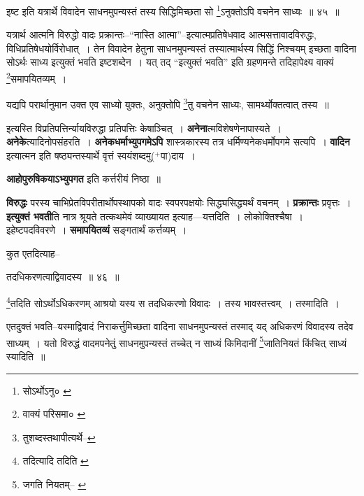 \documentclass[article,12pt,a4paper]{memoir}
\newcommand{\add}[1]{($^{+}$#1)}
\begin{document}
	  \pstart इष्ट इति यत्रार्थे विवादेन साधनमुपन्यस्तं तस्य सिद्धिमिच्छता सो \footnote{सोऽर्थोऽनु० \cite{dp-msC}}\-ऽनुक्तोऽपि वचनेन साध्यः ॥ ४५ ॥
	\pend
      
	  \endgroup
	 

	  \pstart यत्रार्थ आत्मनि विरुद्धो वादः प्रक्रान्तः--“नास्ति आत्मा”--इत्यात्मप्रतिषेधवाद आत्मसत्तावादविरुद्धः, विधिप्रतिषेधयोर्विरोधात् । तेन विवादेन हेतुना साधनमुपन्यस्तं तस्यात्मार्थस्य सिद्धिं निश्चयम् इच्छता वादिना सोऽर्थः साध्य इत्युक्तं भवति इष्टशब्देन । यत् तद् “इत्युक्तं भवति” इति ग्रहणमन्ते तदिहापेक्ष्य वाक्यं \footnote{वाक्यं परिसमा० \cite{dp-msA} \cite{dp-msB} \cite{dp-msC} \cite{dp-msD} \cite{dp-edP} \cite{dp-edH} \cite{dp-edE} \cite{dp-edN}}\-समापयितव्यम् ।
	\pend
       

	  \pstart यद्यपि परार्थानुमान उक्त एव साध्यो युक्तः, अनुक्तोपि \footnote{तुशब्दस्तथापीत्यर्थे--\cite{dp-msD-n}}\-तु वचनेन साध्यः, सामर्थ्योक्तत्वात् तस्य ॥
	\pend
      
	  \endgroup
	

	  \pstart इत्यस्ति विप्रतिपत्तिर्न्यायविरुद्धा प्रतिपत्तिः केषाञ्चित् । \textbf{अनेना}त्मविशेषणेनापास्यते । \textbf{अनेके}त्यादिनोपसंहरति । \textbf{अनेकधर्माभ्युपगमेऽपि} शास्त्रकारस्य तत्र धर्मिण्यनेकधर्मोपगमे सत्यपि । \textbf{वादिन} इत्यात्मन इति षष्ठ्यन्तस्यार्थे वृत्तं स्वयंशब्दमु\add{पा}दाय ।
	\pend
      

	  \pstart \textbf{आहोपुरुषिकयाऽभ्युपगत} इति कर्त्तरीयं निष्ठा ॥
	\pend
      

	  \pstart \textbf{विरुद्धः} परस्य चाभिप्रेतविपरीतार्थोपस्थापको वादः स्वपरपक्षयोः सिद्ध्यसिद्ध्यर्थं वचनम् । \textbf{प्रक्रान्तः} प्रवृत्तः । \textbf{इत्युक्तं भवती}ति नात्र श्रूयते तत्कथमेवं व्याख्यायत इत्याह—यत्तदिति । लोकोक्तिश्चैषा । इहेष्टपदविवरणे । \textbf{समापयितव्यं} सङ्गतार्थं कर्त्तव्यम् ।
	\pend
	  \bigskip
	  \begingroup
	

	  \pstart कुत एतदित्याह--
	\pend
       
	  \bigskip
	  \begingroup
	

	  \pstart तदधिकरणत्वाद्विवादस्य ॥ ४६ ॥
	\pend
      
	  \endgroup
	 

	  \pstart \footnote{तदित्यादि तदिति \cite{dp-msA} \cite{dp-msB} \cite{dp-msC} \cite{dp-msD} \cite{dp-edP} \cite{dp-edH} \cite{dp-edE} \cite{dp-edN}}\-तदिति सोऽर्थोऽधिकरणम् आश्रयो यस्य स तदधिकरणो विवादः । तस्य भावस्तत्त्वम् । तस्मादिति ।
	\pend
       

	  \pstart एतदुक्तं भवति--यस्माद्विवादं निराकर्त्तुमिच्छता वादिना साधनमुपन्यस्तं तस्माद् यद् अधिकरणं विवादस्य तदेव साध्यम् । यतो विरुद्धं वादमपनेतुं साधनमुपन्यस्तं तच्चेत् न साध्यं किमिदानीं \footnote{जगति नियतम्--\cite{dp-msB} \cite{dp-msC} \cite{dp-msD} \cite{dp-edP} \cite{dp-edH} \cite{dp-edE} \cite{dp-edN}}\-जातिनियतं किंचित् साध्यं स्यादिति ॥
	\pend
       
\end{document}
